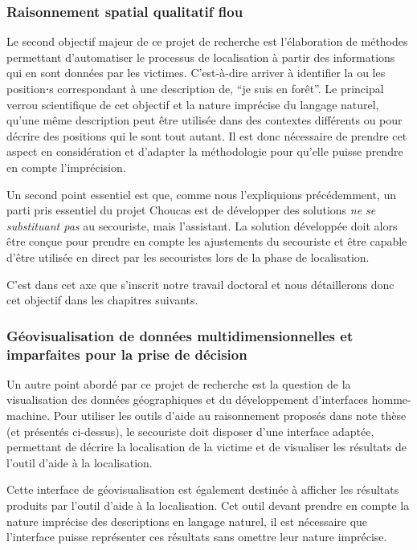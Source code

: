 \subsubsection{Raisonnement spatial qualitatif flou}
\label{subsec:1-2-3-2}

Le second objectif majeur de ce projet de recherche est l’élaboration
de méthodes permettant d'automatiser le processus de localisation à
partir des informations qui en sont données par les
victimes. C'est-à-dire arriver à identifier la ou les position⋅s
correspondant à une description de, \eg \enquote{je suis en forêt}. Le
principal verrou scientifique de cet objectif et la nature imprécise
du langage naturel, \ie qu'une même description peut être utilisée
dans des contextes différents ou pour décrire des positions qui le
sont tout autant. Il est donc nécessaire de prendre cet aspect en
considération et d'adapter la méthodologie pour qu'elle puisse prendre
en compte l'imprécision.

Un second point essentiel est que, comme nous l'expliquions
précédemment, un parti pris essentiel du projet Choucas est de
développer des solutions \emph{ne se substituant pas} au secouriste,
mais l’assistant. La solution développée doit alors être conçue pour
prendre en compte les ajustements du secouriste et être capable d'être
utilisée en direct par les secouristes lors de la phase de
localisation.

C'est dans cet axe que s'inscrit notre travail doctoral et nous
détaillerons donc cet objectif dans les chapitres suivants.

\subsubsection{Géovisualisation de données multidimensionnelles et
  imparfaites pour la prise de décision}
\label{subsec:1-2-3-3}

Un autre point abordé par ce projet de recherche est la question de la
visualisation des données géographiques et du développement
d'interfaces homme-machine. Pour utiliser les outils d'aide au
raisonnement proposés dans note thèse (et présentés ci-dessus), le
secouriste doit disposer d'une interface adaptée, permettant de
décrire la localisation de la victime et de visualiser les résultats
de l'outil d'aide à la localisation. 

Cette interface de géovisualisation est également destinée à afficher
les résultats produits par l'outil d'aide à la localisation. Cet outil
devant prendre en compte la nature imprécise des descriptions en
langage naturel, il est nécessaire que l'interface puisse représenter
ces résultats sans omettre leur nature imprécise.  

